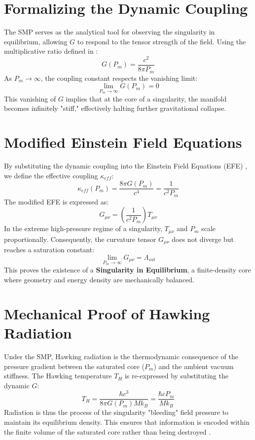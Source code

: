 \documentclass[11pt,letterpaper]{article}
\begin{document}
\section{Formalizing the Dynamic Coupling}
The SMP serves as the analytical tool for observing the singularity in equilibrium, allowing $G$ to respond to the tensor strength of the field. Using the multiplicative ratio defined in \cite{Skavberg2026}:
\begin{equation}
G(P_m) = \frac{c^2}{8\pi P_m}
\end{equation}
As $P_m \to \infty$, the coupling constant respects the vanishing limit:
\begin{equation}
\lim_{P_m \to \infty} G(P_m) = 0
\end{equation}
This vanishing of $G$ implies that at the core of a singularity, the manifold becomes infinitely "stiff," effectively halting further gravitational collapse.

\section{Modified Einstein Field Equations}
By substituting the dynamic coupling into the Einstein Field Equations (EFE) \cite{Einstein1915}, we define the effective coupling $\kappa_{eff}$:
\begin{equation}
\kappa_{eff}(P_m) = \frac{8\pi G(P_m)}{c^4} = \frac{1}{c^2 P_m}
\end{equation}
The modified EFE is expressed as:
\begin{equation}
G_{\mu\nu} = \left( \frac{1}{c^2 P_m} \right) T_{\mu\nu}
\end{equation}
In the extreme high-pressure regime of a singularity, $T_{\mu\nu}$ and $P_m$ scale proportionally. Consequently, the curvature tensor $G_{\mu\nu}$ does not diverge but reaches a saturation constant:
\begin{equation}
\lim_{P_m \to \infty} G_{\mu\nu} = \Lambda_{sat}
\end{equation}
This proves the existence of a \textbf{Singularity in Equilibrium}, a finite-density core where geometry and energy density are mechanically balanced.

\section{Mechanical Proof of Hawking Radiation}
Under the SMP, Hawking radiation \cite{Hawking1976} is the thermodynamic consequence of the pressure gradient between the saturated core ($P_m$) and the ambient vacuum stiffness. The Hawking temperature $T_H$ is re-expressed by substituting the dynamic $G$:
\begin{equation}
T_H = \frac{\hbar c^3}{8\pi G(P_m) M k_B} = \frac{\hbar c P_m}{M k_B}
\end{equation}
Radiation is thus the process of the singularity "bleeding" field pressure to maintain its equilibrium density. This ensures that information is encoded within the finite volume of the saturated core rather than being destroyed \cite{Susskind1995}.
\end{document}

